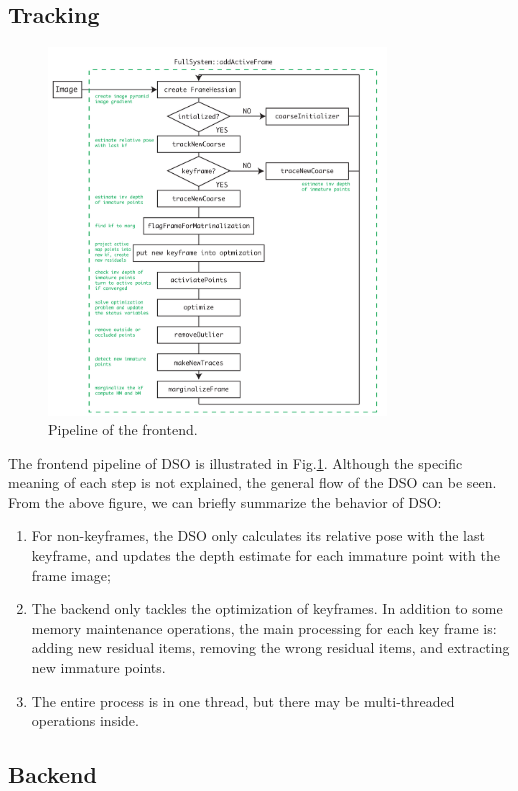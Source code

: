 \documentclass[a4paper,10pt]{article}
\begin{document}
	\subsection{Tracking}
	\begin{figure}[!thp]
	\centering
	\label{fig:frontend-dso}
	\includegraphics[width=0.8\textwidth]{figs/frontend-en}
	\caption{Pipeline of the frontend.}
	\end{figure}
	The frontend pipeline of DSO is illustrated in Fig.\ref{fig:frontend-dso}. Although the specific meaning of each step is not explained, the general flow of the DSO can be seen. From the above figure, we can briefly summarize the behavior of DSO:
	
	\begin{enumerate}
		\item For non-keyframes, the DSO only calculates its relative pose with the last keyframe, and updates the depth estimate for each immature point with the frame image;
		\item The backend only tackles the optimization of keyframes. In addition to some memory maintenance operations, the main processing for each key frame is: adding new residual items, removing the wrong residual items, and extracting new immature points.
		\item The entire process is in one thread, but there may be multi-threaded operations inside.
	\end{enumerate}
	
	\subsection{Backend}
\end{document}
